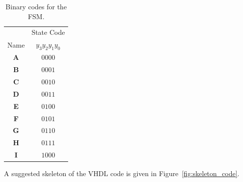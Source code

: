 \documentclass[epsfig,10pt,fullpage]{article}
\begin{document}
\begin{table}[H]
\begin{center}
\begin{tabular}{c|c}
~ & State Code \\ 
Name & $y_3 y_2 y_1 y_0$ \\ \hline
\rule[-0.075in]{0in}{0.25in}{\bf A} & $0000$ \\ 
{\bf B} & $0001$ \\ 
{\bf C} & $0010$ \\ 
{\bf D} & $0011$ \\ 
{\bf E} & $0100$ \\ 
{\bf F} & $0101$ \\ 
{\bf G} & $0110$ \\ 
{\bf H} & $0111$ \\ 
{\bf I} & $1000$ \\ 
\end{tabular}
\end{center}
\caption{Binary codes for the FSM.}
\label{tab:bincodes}
\end{table}

A suggested skeleton of the VHDL code is given in Figure~\ref{fig:skeleton_code}.
\end{document}
